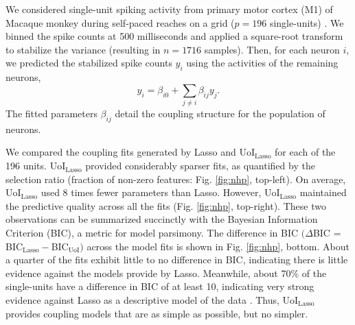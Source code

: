 \documentclass[letterpaper, 10 pt, conference]{ieeeconf}  %
\begin{document}
We considered single-unit spiking activity from primary motor cortex (M1) of Macaque monkey during self-paced reaches on a grid ($p=196$ single-units) \cite{nhp}. We binned the spike counts at 500 milliseconds and applied a square-root transform to stabilize the variance (resulting in $n=1716$ samples). Then, for each neuron $i$, we predicted the stabilized spike counts $y_i$ using the activities of the remaining neurons,
$$
y_i = \beta_{i0} + \sum_{j\neq i} \beta_{ij} y_j.
$$
The fitted parameters $\beta_{ij}$ detail the coupling structure for the population of neurons.

We compared the coupling fits generated by Lasso and UoI$_{\text{Lasso}}$ for each of the 196 units. UoI$_{\text{Lasso}}$ provided considerably sparser fits, as quantified by the selection ratio (fraction of non-zero features: Fig. \ref{fig:nhp}, top-left). On average, UoI$_{\text{Lasso}}$ used 8 times fewer parameters than Lasso. However, UoI$_{\text{Lasso}}$ maintained the predictive quality across all the fits (Fig. \ref{fig:nhp}, top-right). These two observations can be summarized succinctly with the Bayesian Information Criterion (BIC), a metric for model parsimony. The difference in BIC $(\Delta$BIC = BIC$_{\text{Lasso}}-$BIC$_{\text{UoI}})$ across the model fits is shown in Fig. \ref{fig:nhp}, bottom. About a quarter of the fits exhibit little to no difference in BIC, indicating there is little evidence against the models provide by Lasso.  Meanwhile, about 70\% of the single-units have a difference in BIC of at least 10, indicating very strong evidence against Lasso as a descriptive model of the data \cite{kass1995}. Thus, UoI$_{\text{Lasso}}$ provides coupling models that are as simple as possible, but no simpler. 
\end{document}
